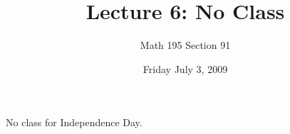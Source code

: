 \documentclass[12pt]{article}
\title{Lecture 6: No Class}
\author{Math 195 Section 91}
\date{Friday July  3, 2009}
\begin{document}
\maketitle

No class for Independence Day.
\end{document}

